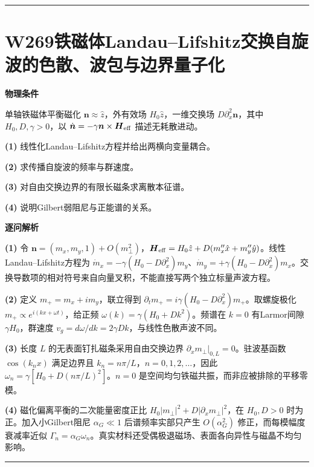 \documentclass[UTF8,a4paper,11pt,oneside,openany]{ctexbook}
\begin{document}
\par\bigskip\hrule\bigskip
\section*{W269\quad 铁磁体Landau–Lifshitz交换自旋波的色散、波包与边界量子化}
\textbf{物理条件}\par 单轴铁磁体平衡磁化 \(\boldsymbol n\approx\hat z\)，外有效场 \(H_0\hat z\)，一维交换场 \(D\partial_x^2\boldsymbol n\)，其中 \(H_0,D,\gamma>0\)，以 \(\dot{\boldsymbol n}=-\gamma\boldsymbol n\times\boldsymbol H_{\rm eff}\) 描述无耗散进动。
\par\noindent\textbf{(1)} 线性化Landau–Lifshitz方程并给出两横向变量耦合。
\par\noindent\textbf{(2)} 求传播自旋波的频率与群速度。
\par\noindent\textbf{(3)} 对自由交换边界的有限长磁条求离散本征谱。
\par\noindent\textbf{(4)} 说明Gilbert弱阻尼与正能谱的关系。

\par\medskip\noindent\textbf{逐问解析}
\par\noindent\textbf{(1)} 令 \(\boldsymbol n=(m_x,m_y,1)+O(m_\perp^2)\)，\(\boldsymbol H_{\rm eff}=H_0\hat z+D(m_x''\hat x+m_y''\hat y)\)。线性Landau–Lifshitz方程为 \(\dot m_x=-\gamma(H_0-D\partial_x^2)m_y\)、\(\dot m_y=+\gamma(H_0-D\partial_x^2)m_x\)。交换导数项的相对符号来自向量叉积，不能直接写两个独立标量声波方程。
\par\noindent\textbf{(2)} 定义 \(m_+=m_x+i m_y\)，联立得到 \(\partial_t m_+=i\gamma(H_0-D\partial_x^2)m_+\)。取螺旋极化 \(m_+\propto e^{i(kx+\omega t)}\)，给正频 \(\omega(k)=\gamma(H_0+Dk^2)\)。频谱在 \(k=0\) 有Larmor间隙 \(\gamma H_0\)，群速度 \(v_g=d\omega/dk=2\gamma Dk\)，与线性色散声波不同。
\par\noindent\textbf{(3)} 长度 \(L\) 的无表面钉扎磁条采用自由交换边界 \(\partial_xm_\perp|_{0,L}=0\)。驻波基函数 \(\cos(k_nx)\) 满足边界且 \(k_n=n\pi/L\)，\(n=0,1,2,\dots\)，因此 \(\omega_n=\gamma[H_0+D(n\pi/L)^2]\)。\(n=0\) 是空间均匀铁磁共振，而非应被排除的平移零模。
\par\noindent\textbf{(4)} 磁化偏离平衡的二次能量密度正比 \(H_0|m_\perp|^2+D|\partial_xm_\perp|^2\)，在 \(H_0,D>0\) 时为正。加入小Gilbert阻尼 \(\alpha_G\ll1\) 后谱频率实部只产生 \(O(\alpha_G^2)\) 修正，而每模幅度衰减率近似 \(\Gamma_n=\alpha_G\omega_n\)。真实材料还受偶极退磁场、表面各向异性与磁晶不均匀影响。

\par\bigskip\hrule\bigskip
\end{document}
